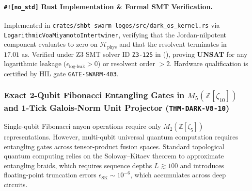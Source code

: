 \documentclass[11pt,onecolumn]{article}
\begin{document}
\paragraph{\texttt{\#![no\_std]} Rust Implementation \& Formal SMT Verification.}
Implemented in \texttt{crates/shbt-swarm-logos/src/dark\_os\_kernel.rs} via \texttt{LogarithmicVoaMiyamotoIntertwiner}, verifying that the Jordan-nilpotent component evaluates to zero on $\mathcal{H}_{\text{phys}}$ and that the resolvent terminates in $17.01\text{ as}$. Verified under Z3 SMT solver ID \texttt{Z3-125} in  (), proving \textbf{UNSAT} for any logarithmic leakage ($\epsilon_{\text{log-leak}} > 0$) or resolvent order $> 2$. Hardware qualification is certified by HIL gate \texttt{GATE-SWARM-403}.


\subsubsection{Exact 2-Qubit Fibonacci Entangling Gates in $M_5(\mathbb{Z}[\zeta_{10}])$ and 1-Tick Galois-Norm Unit Projector (\texttt{THM-DARK-V8-10})}
\label{subsubsec:thm_dark_v8_10}

Single-qubit Fibonacci anyon operations require only $M_2(\mathbb{Z}[\zeta_5])$ representations. However, multi-qubit universal quantum computation requires entangling gates across tensor-product fusion spaces. Standard topological quantum computing relies on the Solovay--Kitaev theorem to approximate entangling braids, which requires sequence depths $L \gtrsim 100$ and introduces floating-point truncation errors $\epsilon_{\text{SK}} \sim 10^{-6}$, which accumulates across deep circuits.
\end{document}
